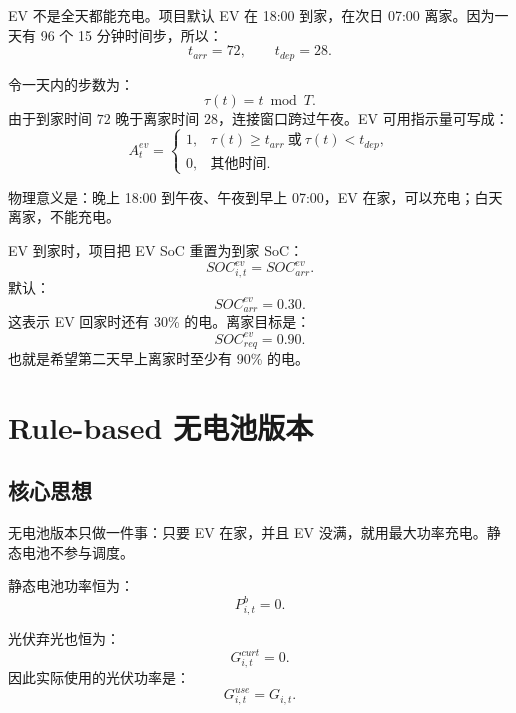 \documentclass[UTF8,zihao=-4]{ctexart}
\begin{document}
EV 不是全天都能充电。项目默认 EV 在 18:00 到家，在次日 07:00 离家。因为一天有 96 个 15 分钟时间步，所以：
\begin{equation}
t_{arr}=72,\qquad t_{dep}=28.
\end{equation}

令一天内的步数为：
\begin{equation}
\tau(t)=t\bmod T.
\end{equation}
由于到家时间 $72$ 晚于离家时间 $28$，连接窗口跨过午夜。EV 可用指示量可写成：
\begin{equation}
A^{ev}_t=
\begin{cases}
1, & \tau(t)\ge t_{arr}\ \text{或}\ \tau(t)<t_{dep},\\
0, & \text{其他时间}.
\end{cases}
\end{equation}

物理意义是：晚上 18:00 到午夜、午夜到早上 07:00，EV 在家，可以充电；白天离家，不能充电。

EV 到家时，项目把 EV SoC 重置为到家 SoC：
\begin{equation}
SOC^{ev}_{i,t}=SOC^{ev}_{arr}.
\end{equation}
默认：
\begin{equation}
SOC^{ev}_{arr}=0.30.
\end{equation}
这表示 EV 回家时还有 30\% 的电。离家目标是：
\begin{equation}
SOC^{ev}_{req}=0.90.
\end{equation}
也就是希望第二天早上离家时至少有 90\% 的电。

\section{Rule-based 无电池版本}

\subsection{核心思想}

无电池版本只做一件事：只要 EV 在家，并且 EV 没满，就用最大功率充电。静态电池不参与调度。

静态电池功率恒为：
\begin{equation}
P^b_{i,t}=0.
\end{equation}

光伏弃光也恒为：
\begin{equation}
G^{curt}_{i,t}=0.
\end{equation}
因此实际使用的光伏功率是：
\begin{equation}
G^{use}_{i,t}=G_{i,t}.
\end{equation}
\end{document}
